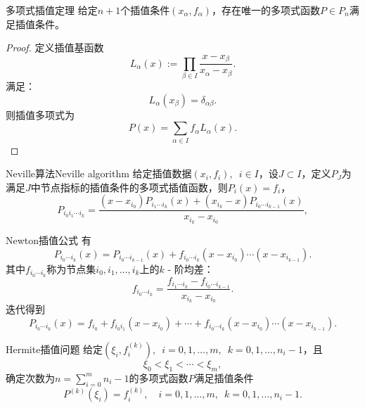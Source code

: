 \begin{theorem}
    {多项式插值定理}{}
    给定$n+1$个插值条件$(x_\alpha,f_\alpha)$，存在唯一的多项式函数$P\in P_n$满足插值条件。
\end{theorem}
\begin{proof}
    定义插值基函数
    \begin{equation}
        L_\alpha(x):=\prod_{\beta\in I}\frac{x-x_\beta}{x_\alpha-x_\beta}.
    \end{equation}
    满足：
    \begin{equation}
        L_\alpha(x_\beta)=\delta_{\alpha\beta}.
    \end{equation}
    则插值多项式为
    \begin{equation}
        P(x)=\sum_{\alpha\in I}f_\alpha L_\alpha(x).
    \end{equation}
\end{proof}

\begin{theorem}
    {Neville算法}{Neville algorithm}
    给定插值数据$(x_i,f_i),\enspace i\in I$，设$J\subset I$，定义$P_J$为满足$J$中节点指标的插值条件的多项式插值函数，则$P_i(x)=f_i$，
    \begin{equation}
        P_{i_0i_1\cdots i_k}=\frac{(x-x_{i_0})P_{i_1\cdots i_k}(x)+(x_{i_k}-x)P_{i_0\cdots i_{k-1}}(x)}{x_{i_k}-x_{i_0}},
    \end{equation}
\end{theorem}

\begin{theorem}
    {Newton插值公式}{}
    有
    \begin{equation}
        P_{i_0\cdots i_k}(x)=P_{i_0\cdots i_{k-1}}(x)+f_{i_0\cdots i_k}(x-x_{i_0})\cdots(x-x_{i_{k-1}}).
    \end{equation}
    其中$f_{i_0\cdots i_k}$称为节点集$i_0,i_1,\ldots,i_k$上的$k$ - 阶均差：
    \begin{equation}
        f_{i_0\cdots i_k}=\frac{f_{i_1\cdots i_k}-f_{i_0\cdots i_{k-1}}}{x_{i_k}-x_{i_0}}.
    \end{equation}
    迭代得到
    \begin{equation}
        P_{i_0\cdots i_k}(x)=f_{i_0}+f_{i_0i_1}(x-x_{i_0})+\cdots+f_{i_0\cdots i_k}(x-x_{i_0})\cdots(x-x_{i_{k-1}}).
    \end{equation}
\end{theorem}

\begin{definition}
    {Hermite插值问题}{}
    给定$(\xi_i,f_i^{(k)}),\enspace i=0,1,\ldots,m,\enspace k=0,1,\ldots,n_i-1$，且
    \[
        \xi_0<\xi_1<\cdots<\xi_m,
    \]
    确定次数为$n=\sum_{i=0}^mn_i-1$的多项式函数$P$满足插值条件
    \begin{equation}
        P^{(k)}(\xi_i)=f_i^{(k)},\quad i=0,1,\ldots,m,\enspace k=0,1,\ldots,n_i-1.
    \end{equation}
\end{definition}

